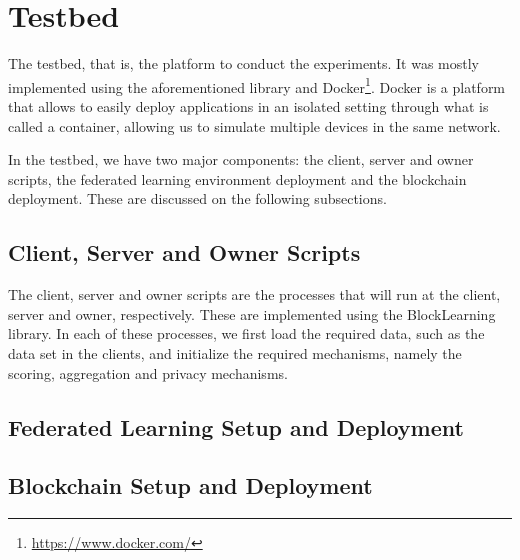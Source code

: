 
\todo{}

\section{Testbed}

The testbed, that is, the platform to conduct the experiments. It was mostly implemented using the aforementioned library and Docker\footnote{\url{https://www.docker.com/}}. Docker is a platform that allows to easily deploy applications in an isolated setting through what is called a container, allowing us to simulate multiple devices in the same network.

In the testbed, we have two major components: the client, server and owner scripts, the federated learning environment deployment and the blockchain deployment. These are discussed on the following subsections.

\subsection{Client, Server and Owner Scripts}

The client, server and owner scripts are the processes that will run at the client, server and owner, respectively. These are implemented using the BlockLearning library. In each of these processes, we first load the required data, such as the data set in the clients, and initialize the required mechanisms, namely the scoring, aggregation and privacy mechanisms.



\subsection{Federated Learning Setup and Deployment}

\subsection{Blockchain Setup and Deployment}


\todo{}

